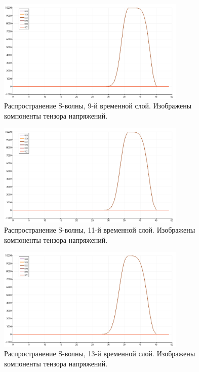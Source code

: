 \begin{figure}[htp]
\centering
\includegraphics[width=0.8\textwidth]{png/s-wave-test/s/0009.png}
\caption{Распространение S-волны, 9-й временной слой. Изображены компоненты тензора напряжений.}
\end{figure}

\begin{figure}[htp]
\centering
\includegraphics[width=0.8\textwidth]{png/s-wave-test/s/0011.png}
\caption{Распространение S-волны, 11-й временной слой. Изображены компоненты тензора напряжений.}
\end{figure}

\begin{figure}[htp]
\centering
\includegraphics[width=0.8\textwidth]{png/s-wave-test/s/0013.png}
\caption{Распространение S-волны, 13-й временной слой. Изображены компоненты тензора напряжений.}
\end{figure}

